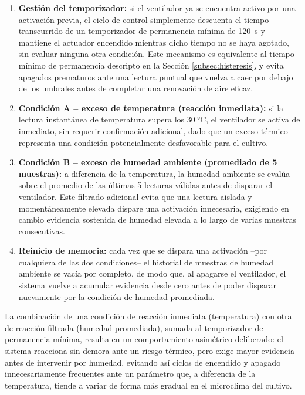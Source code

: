 \begin{enumerate}
\item \textbf{Gestión del temporizador:} si el ventilador ya se encuentra activo por una activación previa, el ciclo de control simplemente descuenta el tiempo transcurrido de un temporizador de permanencia mínima de \SI{120}{\second} y mantiene el actuador encendido mientras dicho tiempo no se haya agotado, sin evaluar ninguna otra condición. Este mecanismo es equivalente al tiempo mínimo de permanencia descripto en la Sección \ref{subsec:histeresis}, y evita apagados prematuros ante una lectura puntual que vuelva a caer por debajo de los umbrales antes de completar una renovación de aire eficaz.

\item \textbf{Condición A -- exceso de temperatura (reacción inmediata):} si la lectura instantánea de temperatura supera los $\SI{30}{\celsius}$, el ventilador se activa de inmediato, sin requerir confirmación adicional, dado que un exceso térmico representa una condición potencialmente desfavorable para el cultivo.

\item \textbf{Condición B -- exceso de humedad ambiente (promediado de 5 muestras):} a diferencia de la temperatura, la humedad ambiente se evalúa sobre el promedio de las últimas 5 lecturas válidas antes de disparar el ventilador. Este filtrado adicional evita que una lectura aislada y momentáneamente elevada dispare una activación innecesaria, exigiendo en cambio evidencia sostenida de humedad elevada a lo largo de varias muestras consecutivas.

\item \textbf{Reinicio de memoria:} cada vez que se dispara una activación --por cualquiera de las dos condiciones-- el historial de muestras de humedad ambiente se vacía por completo, de modo que, al apagarse el ventilador, el sistema vuelve a acumular evidencia desde cero antes de poder disparar nuevamente por la condición de humedad promediada.

\end{enumerate}

La combinación de una condición de reacción inmediata (temperatura) con otra de reacción filtrada (humedad promediada), sumada al temporizador de permanencia mínima, resulta en un comportamiento asimétrico deliberado: el sistema reacciona sin demora ante un riesgo térmico, pero exige mayor evidencia antes de intervenir por humedad, evitando así ciclos de encendido y apagado innecesariamente frecuentes ante un parámetro que, a diferencia de la temperatura, tiende a variar de forma más gradual en el microclima del cultivo.

